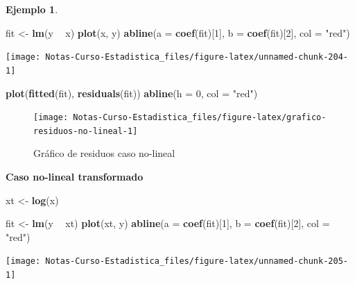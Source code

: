 \documentclass[
  12pt,
]{book}
\newenvironment{Shaded}{\begin{snugshade}}{\end{snugshade}}
\newcommand{\DataTypeTok}[1]{\textcolor[rgb]{0.13,0.29,0.53}{#1}}
\newcommand{\DecValTok}[1]{\textcolor[rgb]{0.00,0.00,0.81}{#1}}
\newcommand{\KeywordTok}[1]{\textcolor[rgb]{0.13,0.29,0.53}{\textbf{#1}}}
\newcommand{\NormalTok}[1]{#1}
\newcommand{\OperatorTok}[1]{\textcolor[rgb]{0.81,0.36,0.00}{\textbf{#1}}}
\newcommand{\StringTok}[1]{\textcolor[rgb]{0.31,0.60,0.02}{#1}}
\theoremstyle{definition}
\theoremstyle{definition}
\newtheorem{example}{Ejemplo}[chapter]
\theoremstyle{definition}
\theoremstyle{remark}
\begin{document}
\begin{example}
\begin{Shaded}
\begin{Highlighting}[]
\NormalTok{fit <-}\StringTok{ }\KeywordTok{lm}\NormalTok{(y }\OperatorTok{~}\StringTok{ }\NormalTok{x)}
\KeywordTok{plot}\NormalTok{(x, y)}
\KeywordTok{abline}\NormalTok{(}\DataTypeTok{a =} \KeywordTok{coef}\NormalTok{(fit)[}\DecValTok{1}\NormalTok{], }\DataTypeTok{b =} \KeywordTok{coef}\NormalTok{(fit)[}\DecValTok{2}\NormalTok{], }\DataTypeTok{col =} \StringTok{"red"}\NormalTok{)}
\end{Highlighting}
\end{Shaded}

\begin{center}\texttt{[image: Notas-Curso-Estadistica\_files/figure-latex/unnamed-chunk-204-1]} \end{center}

\begin{Shaded}
\begin{Highlighting}[]
\KeywordTok{plot}\NormalTok{(}\KeywordTok{fitted}\NormalTok{(fit), }\KeywordTok{residuals}\NormalTok{(fit))}
\KeywordTok{abline}\NormalTok{(}\DataTypeTok{h =} \DecValTok{0}\NormalTok{, }\DataTypeTok{col =} \StringTok{"red"}\NormalTok{)}
\end{Highlighting}
\end{Shaded}

\begin{figure}

{\centering \texttt{[image: Notas-Curso-Estadistica\_files/figure-latex/grafico-residuos-no-lineal-1]} 

}

\caption{Gráfico de residuos caso no-lineal}\label{fig:grafico-residuos-no-lineal}
\end{figure}

\textbf{Caso no-lineal transformado}

\begin{Shaded}
\begin{Highlighting}[]
\NormalTok{xt <-}\StringTok{ }\KeywordTok{log}\NormalTok{(x)}


\NormalTok{fit <-}\StringTok{ }\KeywordTok{lm}\NormalTok{(y }\OperatorTok{~}\StringTok{ }\NormalTok{xt)}
\KeywordTok{plot}\NormalTok{(xt, y)}
\KeywordTok{abline}\NormalTok{(}\DataTypeTok{a =} \KeywordTok{coef}\NormalTok{(fit)[}\DecValTok{1}\NormalTok{], }\DataTypeTok{b =} \KeywordTok{coef}\NormalTok{(fit)[}\DecValTok{2}\NormalTok{], }\DataTypeTok{col =} \StringTok{"red"}\NormalTok{)}
\end{Highlighting}
\end{Shaded}

\begin{center}\texttt{[image: Notas-Curso-Estadistica\_files/figure-latex/unnamed-chunk-205-1]} \end{center}


\end{example}
\end{document}

